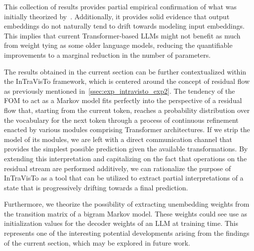 This collection of results provides partial empirical confirmation of what was initially theorized by~\citet{elhage2021}.
Additionally, it provides solid evidence that output embeddings do not naturally tend to drift towards modeling input embeddings.
This implies that current Transformer-based LLMs might not benefit as much from weight tying as some older language models, reducing the quantifiable improvements to a marginal reduction in the number of parameters.

The results obtained in the current section can be further contextualized within the InTraVisTo framework, which is centered around the concept of residual flow as previously mentioned in~\cref{ssec:exp_intravisto_exp2}.
The tendency of the FOM to act as a Markov model fits perfectly into the perspective of a residual flow that, starting from the current token, reaches a probability distribution over the vocabulary for the next token through a process of continuous refinement enacted by various modules comprising Transformer architectures.
If we strip the model of its modules, we are left with a direct communication channel that provides the simplest possible prediction given the available transformations.
By extending this interpretation and capitalizing on the fact that operations on the residual stream are performed additively, we can rationalize the purpose of InTraVisTo as a tool that can be utilized to extract partial interpretations of a state that is progressively drifting towards a final prediction.

Furthermore, we theorize the possibility of extracting unembedding weights from the transition matrix of a bigram Markov model.
These weights could see use as initialization values for the decoder weights of an LLM at training time.
This represents one of the interesting potential developments arising from the findings of the current section, which may be explored in future work.
